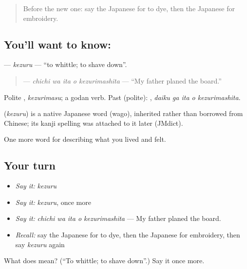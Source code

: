 \label{lesson:JA-C467-kezuru}



\begin{quote}
Before the new one: say the Japanese for to dye, then the Japanese for embroidery.
\end{quote}

\subsection*{You'll want to know: }
\textbf{} — \emph{kezuru} — \textquotedblleft{}to whittle; to shave down\textquotedblright{}.

\begin{quote}
\textbf{  } — \emph{chichi wa ita o kezurimashita} — \textquotedblleft{}My father planed the board.\textquotedblright{}
\end{quote}

Polite \textbf{}, \emph{kezurimasu}; a godan verb. Past (polite): \textbf{  }, \emph{daiku ga ita o kezurimashita}.

\begin{cousinweb}
\textbf{} (\emph{kezuru}) is a native Japanese word (wago), inherited rather than borrowed from Chinese; its kanji spelling was attached to it later (JMdict).
\end{cousinweb}

\begin{grammarlens}[title={What you've built}]
One more word for describing what you lived and felt.
\end{grammarlens}

\subsection*{Your turn}
\begin{itemize}
\raggedright
  \item \emph{Say it:} \emph{kezuru}
  \item \emph{Say it:} \emph{kezuru}, once more
  \item \emph{Say it:} \emph{chichi wa ita o kezurimashita} — My father planed the board.
  \item \emph{Recall:} say the Japanese for to dye, then the Japanese for embroidery, then say \emph{kezuru} again
\end{itemize}

\begin{tcolorbox}[breakable,colback=teal!4,colframe=teal!35!black,title={Before you move on}]
What does  mean? (\textquotedblleft{}To whittle; to shave down\textquotedblright{}.) Say it once more.
\end{tcolorbox}
